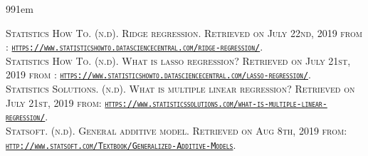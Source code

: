 \documentclass[11pt]{article}
\begin{document}
\def\bibindent{1em}
\begin{thebibliography}{99\kern\bibindent}
\makeatletter
\let\old@biblabel\@biblabel
\def\@biblabel#1{\old@biblabel{#1}\kern\bibindent}
\let\old@bibitem\bibitem
\def\bibitem#1{\old@bibitem{#1}\leavevmode\kern-\bibindent}
\makeatother

\textsc{Statistics How To. (n.d). Ridge regression. Retrieved on July 22nd, 2019 from : \href{https://www.statisticshowto.datasciencecentral.com/ridge-regression/}{\texttt{https://www.statisticshowto.datasciencecentral.com/ridge-regression/}}.}\\[.2cm]

\textsc{Statistics How To. (n.d). What is lasso regression? Retrieved on July 21st, 2019 from : \href{https://www.statisticshowto.datasciencecentral.com/lasso-regression/}{\texttt{https://www.statisticshowto.datasciencecentral.com/lasso-regression/}}.}\\[.2cm]

\textsc{Statistics Solutions. (n.d). What is multiple linear regression? Retrieved on July 21st, 2019 from: \href{https://www.statisticssolutions.com/what-is-multiple-linear-regression/}{\texttt{https://www.statisticssolutions.com/what-is-multiple-linear-regression/}}.}\\[.2cm]

\textsc{Statsoft. (n.d). General additive model. Retrieved on Aug 8th, 2019 from: \href{http://www.statsoft.com/Textbook/Generalized-Additive-Models}{\texttt{http://www.statsoft.com/Textbook/Generalized-Additive-Models}}.}\\[.2cm]
\end{thebibliography}
\end{document}
